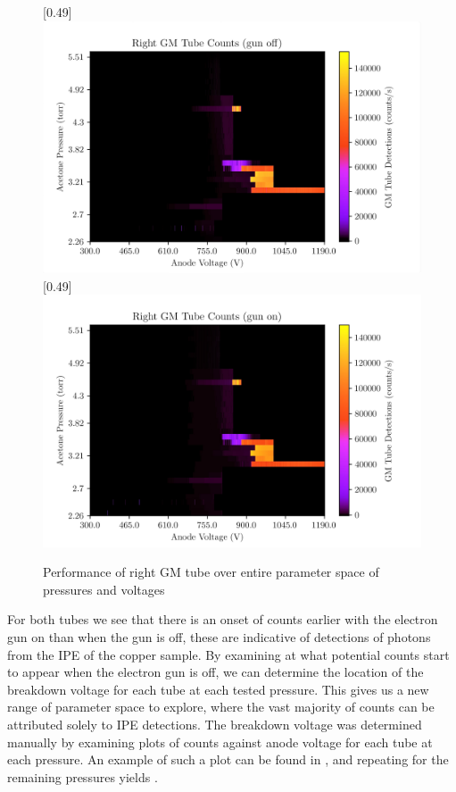 \begin{figure}[h!]
    \centering
    [0.49\linewidth]{\includegraphics[scale=0.65]{Figs/RGMGunOff.jpg}}
    [0.49\linewidth]{\includegraphics[scale=0.65]{Figs/RGMGunOn.jpg}}
    \caption{Performance of right GM tube over entire parameter space of pressures and voltages}
    \label{fig:paramRGM}
\end{figure}

For both tubes we see that there is an onset of counts earlier with the electron gun on than when the gun is off, these are indicative of detections of photons from the IPE of the copper sample.
By examining at what potential counts start to appear when the electron gun is off, we can determine the location of the breakdown voltage for each tube at each tested pressure. This 
gives us a new range of parameter space to explore, where the vast majority of counts can be attributed solely to IPE detections. The breakdown voltage was determined manually by examining plots 
of counts against anode voltage for each tube at each pressure. An example of such a plot can be found in , and repeating for the remaining pressures yields .

